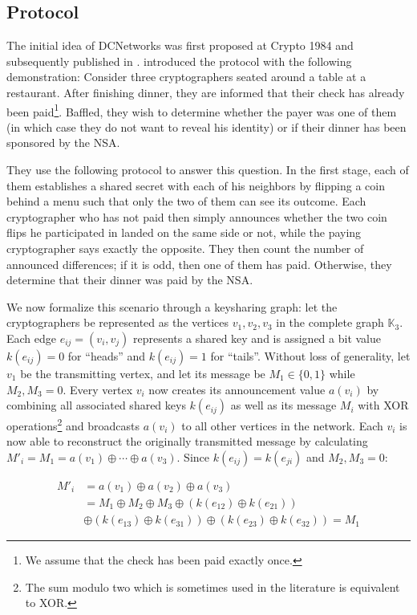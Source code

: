 \subsection{Protocol}

The initial idea of \acp{DCNetwork} was first proposed
at Crypto 1984 and subsequently published in \citeyear{journals/joc/Chaum88} \cite{journals/joc/Chaum88}.
\citeauthor{journals/joc/Chaum88} introduced the protocol with the following demonstration:
Consider three cryptographers seated around a table at a restaurant.
After finishing dinner, they are informed that their check has already been paid\footnote{
We assume that the check has been paid exactly once.}.
Baffled, they wish to determine whether the payer was one of them (in which case
they do not want to reveal his identity) or if their dinner has been sponsored by the NSA.

They use the following protocol to answer this question.
In the first stage, each of them establishes a shared secret with each of his neighbors by flipping
a coin behind a menu such that only the two of them can see its outcome. 
Each cryptographer
who has not paid then simply announces whether the two coin flips he participated
in landed on the same side or not, while the paying cryptographer says exactly the opposite.
They then count the number of announced differences; if it is odd, then one of them has paid.
Otherwise, they determine that their dinner was paid by the NSA.

We now formalize this scenario through a keysharing graph: let the cryptographers be represented as the vertices 
$v_1, v_2, v_3$ in the complete graph $\mathbb{K}_3$. Each edge $e_{ij} = (v_i, v_j)$ represents a shared
key and is assigned a bit value $k(e_{ij}) = 0$ for ``heads'' and $k(e_{ij}) = 1$ for ``tails''. Without loss of generality,
let $v_1$ be the transmitting vertex, and let its message be $M_1 \in \{0, 1\}$ while $M_2, M_3 = 0$.
Every vertex $v_i$ now creates its announcement value $a(v_i)$ by combining all associated shared keys $k(e_{ij})$
as well as its message $M_i$ with XOR operations\footnote{
The sum modulo two which is sometimes used in the literature is equivalent to XOR.}
and broadcasts $a(v_i)$ to all other vertices in the network. Each $v_i$ is now able to
reconstruct the originally transmitted message by calculating
$M'_i = M_1 = a(v_1) \oplus \cdots \oplus a(v_3)$. Since $k(e_{ij}) = k(e_{ji})$ and $M_2, M_3 = 0$:

\begin{align*}
M'_i &= a(v_1) \oplus a(v_2) \oplus a(v_3) \\
     &= M_1 \oplus M_2 \oplus M_3
     \oplus (k(e_{12}) \oplus k(e_{21})) \\
     & \oplus (k(e_{13}) \oplus k(e_{31})) 
     \oplus (k(e_{23}) \oplus k(e_{32})) = M_1
\end{align*}

